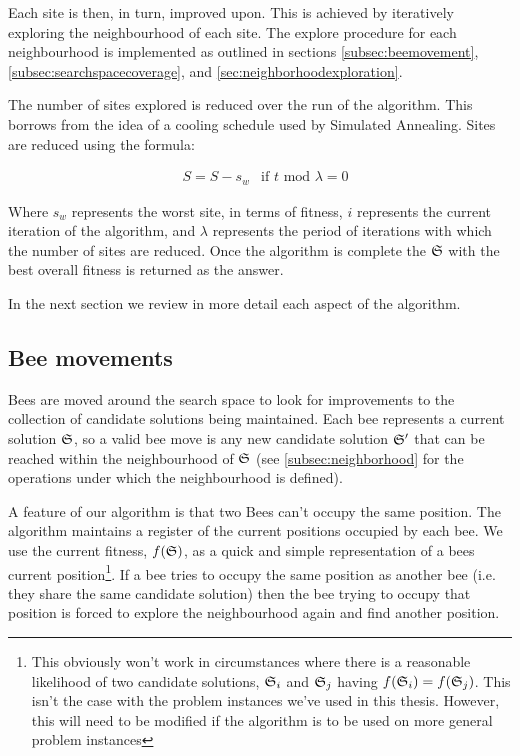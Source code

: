 Each site is then, in turn, improved upon. This is achieved by iteratively exploring the neighbourhood of each site. The explore procedure for each neighbourhood is implemented as outlined in sections \ref{subsec:beemovement}, \ref{subsec:searchspacecoverage}, and \ref{sec:neighborhoodexploration}.

The number of sites explored is reduced over the run of the algorithm. This borrows from the idea of a cooling schedule used by Simulated Annealing. Sites are reduced using the formula:

\begin{align}
   & S = S - s_w & \text{if $t \text{ mod } \lambda = 0$}
\end{align}

Where $s_w$ represents the worst site, in terms of fitness, $i$ represents the current iteration of the algorithm, and $\lambda$ represents the period of iterations with which the number of sites are reduced. Once the algorithm is complete the $\mathfrak{S}$ with the best overall fitness is returned as the answer.

In the next section we review in more detail each aspect of the algorithm. 

\subsection{Bee movements}
\label{beemovement}

Bees are moved around the search space to look for improvements to the collection of candidate solutions being maintained. Each bee represents a current solution $\mathfrak{S}$, so a valid bee move is any new candidate solution $\mathfrak{S}'$ that can be reached within the neighbourhood of $\mathfrak{S}$ (see \ref{subsec:neighborhood} for the operations under which the neighbourhood is defined).


A feature of our algorithm is that two Bees can't occupy the same position. The algorithm maintains a register of the current positions occupied by each bee. We use the current fitness, $f(\mathfrak{S})$, as a quick and simple representation of a bees current position\footnote{This obviously won't work in circumstances where there is a reasonable likelihood of two candidate solutions, $\mathfrak{S}_i$ and $\mathfrak{S}_j$ having $f(\mathfrak{S}_i) = f(\mathfrak{S}_j)$. This isn't the case with the problem instances we've used in this thesis. However, this will need to be modified if the algorithm is to be used on more general problem instances}. If a bee tries to occupy the same position as another bee (i.e. they share the same candidate solution) then the bee trying to occupy that position is forced to explore the neighbourhood again and find another position. 

